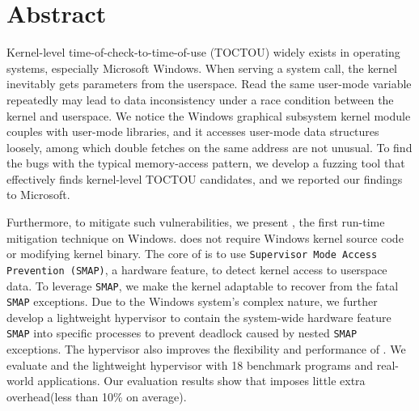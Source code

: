 \section{Abstract}




Kernel-level time-of-check-to-time-of-use (TOCTOU) widely exists in operating systems, especially Microsoft Windows. When serving a system call, the kernel inevitably gets parameters from the userspace. Read the same user-mode variable repeatedly may lead to data inconsistency under a race condition between the kernel and userspace.  We notice the Windows graphical subsystem kernel module couples with user-mode libraries, and it accesses user-mode data structures loosely, among which double fetches on the same address are not unusual. To find the bugs with the typical memory-access pattern, we develop a fuzzing tool that effectively finds kernel-level TOCTOU candidates, and we reported our findings to Microsoft. 

Furthermore, to mitigate such vulnerabilities, we present \name, the first run-time mitigation technique on Windows. \name does not require Windows kernel source code or modifying kernel binary. The core of \name is to use \texttt{Supervisor Mode Access Prevention (SMAP)}, a hardware feature, to detect kernel access to userspace data. To leverage \texttt{SMAP}, we make the kernel adaptable to recover from the fatal \texttt{SMAP} exceptions. Due to the Windows system's complex nature, we further develop a lightweight hypervisor to contain the system-wide hardware feature \texttt{SMAP} into specific processes to prevent deadlock caused by nested \texttt{SMAP} exceptions. The hypervisor also improves the flexibility and performance of \name. We evaluate \name and the lightweight hypervisor with 18 benchmark programs and real-world applications. Our evaluation results show that \name imposes little extra overhead(less than 10\% on average).

